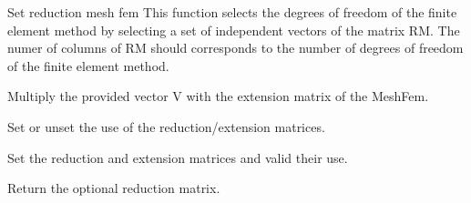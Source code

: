 \documentclass[a4paper,11pt,english]{sphinxmanual}
\begin{document}
\begin{fulllineitems}
\begin{fulllineitems}
\label{\detokenize{python/cmdref_MeshFem:getfem.MeshFem.reduce_meshfem}}
Set reduction mesh fem
This function selects the degrees of freedom of the finite element
method by selecting a set of independent vectors of the matrix RM.
The numer of columns of RM should corresponds to the number of degrees
of freedom of the finite element method.

\end{fulllineitems}


\begin{fulllineitems}
\label{\detokenize{python/cmdref_MeshFem:getfem.MeshFem.reduce_vector}}
Multiply the provided vector V with the extension matrix of the MeshFem.

\end{fulllineitems}


\begin{fulllineitems}
\label{\detokenize{python/cmdref_MeshFem:getfem.MeshFem.reduction}}
Set or unset the use of the reduction/extension matrices.

\end{fulllineitems}


\begin{fulllineitems}
\label{\detokenize{python/cmdref_MeshFem:getfem.MeshFem.reduction_matrices}}
Set the reduction and extension matrices and valid their use.

\end{fulllineitems}


\begin{fulllineitems}
\label{\detokenize{python/cmdref_MeshFem:getfem.MeshFem.reduction_matrix}}
Return the optional reduction matrix.


\end{fulllineitems}
\end{fulllineitems}
\end{document}
